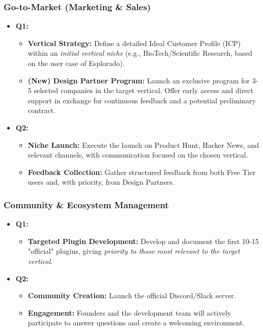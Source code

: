 \documentclass[11pt, a4paper, oneside]{article}
\begin{document}
\subsubsection*{Go-to-Market (Marketing \& Sales)}
\begin{itemize}[leftmargin=*]
    \item \textbf{Q1:}
    \begin{itemize}
        \item \textbf{Vertical Strategy:} Define a detailed Ideal Customer Profile (ICP) within an \textit{initial vertical niche} (e.g., BioTech/Scientific Research, based on the user case of Esplorado).
        \item \textbf{(New) Design Partner Program:} Launch an exclusive program for 3-5 selected companies in the target vertical. Offer early access and direct support in exchange for continuous feedback and a potential preliminary contract.
    \end{itemize}
    \item \textbf{Q2:}
    \begin{itemize}
        \item \textbf{Niche Launch:} Execute the launch on Product Hunt, Hacker News, and relevant channels, with communication focused on the chosen vertical.
        \item \textbf{Feedback Collection:} Gather structured feedback from both Free Tier users and, with priority, from Design Partners.
    \end{itemize}
\end{itemize}

\subsubsection*{Community \& Ecosystem Management}
\begin{itemize}[leftmargin=*]
    \item \textbf{Q1:}
    \begin{itemize}
        \item \textbf{Targeted Plugin Development:} Develop and document the first 10-15 "official" plugins, giving \textit{priority to those most relevant to the target vertical}.
    \end{itemize}
    \item \textbf{Q2:}
    \begin{itemize}
        \item \textbf{Community Creation:} Launch the official Discord/Slack server.
        \item \textbf{Engagement:} Founders and the development team will actively participate to answer questions and create a welcoming environment.
    \end{itemize}
\end{itemize}
\end{document}
